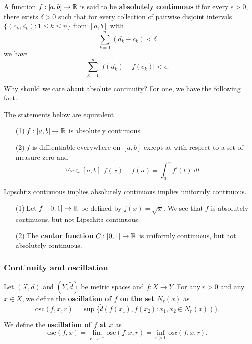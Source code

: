 \begin{definition}\label{Absolutely Continuous Functions}
    A function \( f:[a,b] \to \mathbb{R}  \) is said to be \textbf{absolutely continuous} if for every \( \epsilon > 0  \), there exists \( \delta > 0  \) such that for every collection of pairwise disjoint intervals \( \{ ({c}_{k }, {d}_{k}) : 1 \leq k \leq n  \}  \) from \( [a,b] \) with 
    \[  \sum_{ k=1  }^{ n } ({d}_{k} - {c}_{k}) < \delta \]
    we have 
    \[  \sum_{ k=1  }^{ n } | f({d}_{k}) - f({c}_{k}) |  < \epsilon. \]
\end{definition}

Why should we care about absolute continuity? For one, we have the following fact:

The statements below are equivalent
\begin{enumerate}
    \item[(1)] \( f : [a,b] \to \mathbb{R}  \) is absolutely continuous
    \item[(2)] \( f  \) is diffrentiable everywhere on \( [a,b] \) except at with respect to a set of measure zero and 
        \[  \forall x \in [a,b] \ \ f(x) - f(a) = \int_{ a }^{ x }  f'(t) \ dt. \]
\end{enumerate}

\begin{theorem}
   Lipschitz continuous implies absolutely continuous implies uniformly continuous.  
\end{theorem}

\begin{eg}
    \begin{enumerate}
        \item[(1)] Let \( f : [0,1] \to \mathbb{R}  \) be defined by \( f(x) = \sqrt{ x  }  \). We see that \( f  \) is absolutely continuous, but not Lipschitz continuous.
        \item[(2)] The \textbf{cantor function} \( C : [0,1] \to \mathbb{R}  \) is uniformly continuous, but not absolutely continuous.
     \end{enumerate}
\end{eg}

\subsubsection{Continuity and oscillation}\label{Continuity and oscillation}

\begin{definition}
    Let \( (X,d) \) and \( (Y,\tilde{d}) \) be metric spaces and \( f: X \to Y  \). For any \( r > 0  \) and any \( x \in X  \), we define the \textbf{oscillation of \( f  \) on the set \( {N}_{r}(x) \)} as 
    \[  \text{osc}(f, x, r) = \sup \{ \tilde{d}(f({x}_{1}), f({x}_{2}) : {x}_{1}, {x}_{2} \in {N}_{r}(x)) \}.  \]

    We define the \textbf{oscillation of \( f  \) at \( x  \)} as 
    \[  \text{osc}(f,x) = \lim_{ r \to  0^{+} }  \text{osc}(f,x,r) = \inf_{r > 0 } \text{osc}(f,x,r). \]
    \[   \]
\end{definition}

